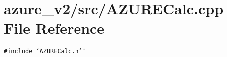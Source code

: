 \section{azure\_\-v2/src/AZURECalc.cpp File Reference}
\label{AZURECalc_8cpp}
{\tt \#include \char`\"{}AZURECalc.h\char`\"{}}\par
